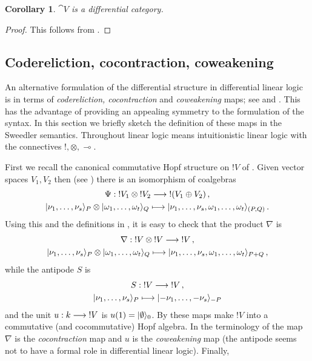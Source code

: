 \documentclass[english,letter paper,12pt,reqno]{article}
\DeclarePairedDelimiter\ket{\lvert}{\rangle}
\newtheorem{corollary}[theorem]{Corollary}
\theoremstyle{example}
\begin{document}
\begin{corollary} $\cat{V}$ is a differential category.
\end{corollary}
\begin{proof}
This follows from \cite[Proposition 2.6]{blutecs}.
\end{proof}

\subsection{Codereliction, cocontraction, coweakening}\label{section:coder}

An alternative formulation of the differential structure in differential linear logic is in terms of \emph{codereliction, cocontraction} and \emph{coweakening} maps; see \cite{fiore} and \cite[\S 5.1]{blutecon}. This has the advantage of providing an appealing symmetry to the formulation of the syntax. In this section we briefly sketch the definition of these maps in the Sweedler semantics. Throughout linear logic means intuitionistic linear logic with the connectives ${!}, \otimes, \multimap$.

First we recall the canonical commutative Hopf structure on ${!} V$ of \cite[\S 6.4]{sweedler}. Given vector spaces $V_1,V_2$ then (see \cite[Remark 2.19]{sweedler}) there is an isomorphism of coalgebras
\begin{gather*}
\Psi: {!} V_1 \otimes {!} V_2 \lto {!} (V_1 \oplus V_2)\,,\\
\ket{\nu_1,\ldots,\nu_s}_P \otimes \ket{\omega_1,\ldots,\omega_t}_Q \longmapsto \ket{\nu_1,\ldots,\nu_s,\omega_1,\ldots,\omega_t}_{(P,Q)}\,.
\end{gather*}
Using this and the definitions in \cite{sweedler}, it is easy to check that the product $\nabla$ is
\begin{gather*}
\nabla: {!} V \otimes {!} V \lto {!} V\,,\\
\ket{\nu_1,\ldots,\nu_s}_P \otimes \ket{\omega_1,\ldots,\omega_t}_Q \longmapsto \ket{\nu_1,\ldots,\nu_s,\omega_1,\ldots,\omega_t}_{P+Q}\,,
\end{gather*}
while the antipode $S$ is
\begin{gather*}
S: {!} V \lto {!} V\,,\\
\ket{\nu_1,\ldots,\nu_s}_P \longmapsto \ket{-\nu_1,\ldots,-\nu_s}_{-P}
\end{gather*}
and the unit $u: k \longrightarrow {!} V$ is $u(1) = \ket{\emptyset}_0$. By \cite[Theorem 6.4.8]{sweedler} these maps make ${!} V$ into a commutative (and cocommutative) Hopf algebra. In the terminology of \cite{ehrhard-survey} the map $\nabla$ is the \emph{cocontraction} map and $u$ is the \emph{coweakening} map (the antipode seems not to have a formal role in differential linear logic). Finally,
\end{document}
